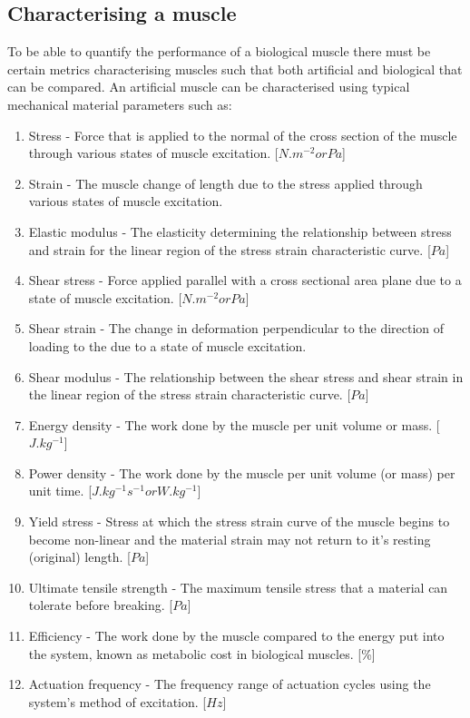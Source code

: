 \subsection{Characterising a muscle}
To be able to quantify the performance of a biological muscle there must be certain metrics characterising muscles such that both artificial and biological that can be compared. An artificial muscle can be characterised using typical mechanical material parameters such as:
\begin{enumerate}
    \item Stress - Force that is applied to the normal of the cross section of the muscle through various states of muscle excitation. [$N.m^{-2} or Pa$]
    \item Strain - The muscle change of length due to the stress applied through various states of muscle excitation.
    \item Elastic modulus - The elasticity determining the relationship between stress and strain for the linear region of the stress strain characteristic curve. [$Pa$]
    \item Shear stress - Force applied parallel with a cross sectional area plane due to a state of muscle excitation. [$N.m^{-2} or Pa$]
    \item Shear strain - The change in deformation perpendicular to the direction of loading to the due to a state of muscle excitation.
    \item Shear modulus - The relationship between the shear stress and shear strain in the linear region of the stress strain characteristic curve. [$Pa$]
    \item Energy density - The work done by the muscle per unit volume or mass. [$J.kg^{-1}$]
    \item Power density - The work done by the muscle per unit volume (or mass) per unit time. [$J.kg^{-1}s^{-1} or W.kg^{-1}$]
    \item Yield stress - Stress at which the stress strain curve of the muscle begins to become non-linear and the material strain may not return to it's resting (original) length. [$Pa$] 
    \item Ultimate tensile strength - The maximum tensile stress that a material can tolerate before breaking. [$Pa$]
    \item Efficiency - The work done by the muscle compared to the energy put into the system, known as metabolic cost in biological muscles. [\%]
    \item Actuation frequency - The frequency range of actuation cycles using the system's method of excitation. [$Hz$]

\end{enumerate}
